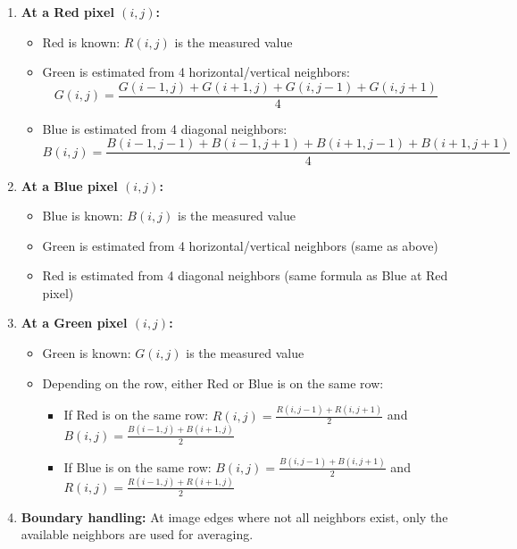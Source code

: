 \documentclass[12pt]{article}
\begin{document}
\begin{enumerate}
    \item \textbf{At a Red pixel $(i, j)$:}
    \begin{itemize}
        \item Red is known: $R(i,j)$ is the measured value
        \item Green is estimated from 4 horizontal/vertical neighbors:
        \[
        G(i,j) = \frac{G(i-1,j) + G(i+1,j) + G(i,j-1) + G(i,j+1)}{4}
        \]
        \item Blue is estimated from 4 diagonal neighbors:
        \[
        B(i,j) = \frac{B(i-1,j-1) + B(i-1,j+1) + B(i+1,j-1) + B(i+1,j+1)}{4}
        \]
    \end{itemize}
    
    \item \textbf{At a Blue pixel $(i, j)$:}
    \begin{itemize}
        \item Blue is known: $B(i,j)$ is the measured value
        \item Green is estimated from 4 horizontal/vertical neighbors (same as above)
        \item Red is estimated from 4 diagonal neighbors (same formula as Blue at Red pixel)
    \end{itemize}
    
    \item \textbf{At a Green pixel $(i, j)$:}
    \begin{itemize}
        \item Green is known: $G(i,j)$ is the measured value
        \item Depending on the row, either Red or Blue is on the same row:
        \begin{itemize}
            \item If Red is on the same row: $R(i,j) = \frac{R(i,j-1) + R(i,j+1)}{2}$ and $B(i,j) = \frac{B(i-1,j) + B(i+1,j)}{2}$
            \item If Blue is on the same row: $B(i,j) = \frac{B(i,j-1) + B(i,j+1)}{2}$ and $R(i,j) = \frac{R(i-1,j) + R(i+1,j)}{2}$
        \end{itemize}
    \end{itemize}
    
    \item \textbf{Boundary handling:} At image edges where not all neighbors exist, only the available neighbors are used for averaging.
\end{enumerate}
\end{document}

